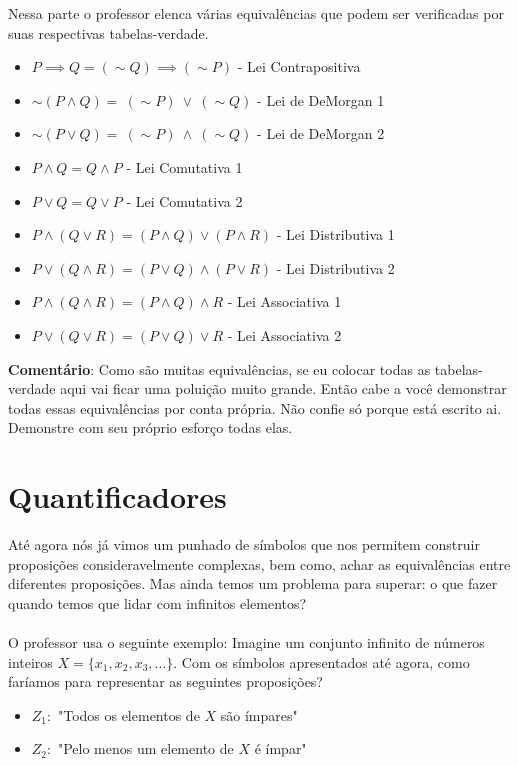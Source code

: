 \documentclass[a4paper,11pt]{book}
\theoremstyle{definition}
\theoremstyle{break}
\begin{document}
Nessa parte o professor elenca várias equivalências que podem ser verificadas por suas respectivas tabelas-verdade.

\begin{itemize}
\item $ P \implies Q = (\sim Q) \implies (\sim P) $ - Lei Contrapositiva
\item $ \sim (P \land Q) = \  (\sim P) \ \lor \ (\sim Q) $ - Lei de DeMorgan 1
\item $ \sim (P \lor Q) = \  (\sim P) \ \land \ (\sim Q) $ - Lei de DeMorgan 2
\item $ P \land Q = Q \land P $ - Lei Comutativa 1
\item $ P \lor Q = Q \lor P $ - Lei Comutativa 2
\item $ P \land (Q \lor R) = (P \land Q) \lor (P \land R)$ - Lei Distributiva 1
\item $ P \lor (Q \land R) = (P \lor Q) \land (P \lor R) $ - Lei Distributiva 2
\item $ P \land (Q \land R) = (P \land Q) \land R $ - Lei Associativa 1
\item $ P \lor (Q \lor R) = (P \lor Q) \lor R $ - Lei Associativa 2
\end{itemize}

\textbf{Comentário}: Como são muitas equivalências, se eu colocar todas as tabelas-verdade aqui vai ficar uma poluição muito grande. Então cabe a você demonstrar todas essas equivalências por conta própria. Não confie só porque está escrito ai. Demonstre com seu próprio esforço todas elas.

\section{Quantificadores}

Até agora nós já vimos um punhado de símbolos que nos permitem construir proposições consideravelmente complexas, bem como, achar as equivalências entre diferentes proposições. Mas ainda temos um problema para superar: o que fazer quando temos que lidar com infinitos elementos?
\\
\\
O professor usa o seguinte exemplo: Imagine um conjunto infinito de números inteiros $X = \{ x_1,x_2,x_3, \dots \}$. Com os símbolos apresentados até agora, como faríamos para representar as seguintes proposições?

\begin{itemize}
\item $Z_1:$ "Todos os elementos de $X$ são ímpares"
\item $Z_2:$ "Pelo menos um elemento de $X$ é ímpar"
\end{itemize}
\end{document}
